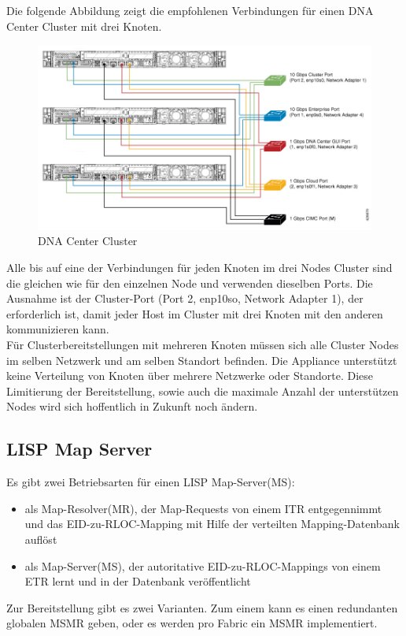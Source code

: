Die folgende Abbildung zeigt die empfohlenen Verbindungen für einen DNA Center Cluster mit drei Knoten. 
\begin{figure}[H]
	\centering
	\includegraphics[width=0.8\linewidth]{img/Absicherung/DNAC-Cluster}
	\caption{DNA Center Cluster \cite{DNAC-Cluster} }
	\label{fig:DNA Center Cluster}
\end{figure}
Alle bis auf eine der Verbindungen für jeden Knoten im drei Nodes Cluster sind die gleichen wie für den einzelnen Node und verwenden dieselben Ports. Die Ausnahme ist der Cluster-Port (Port 2, enp10so, Network Adapter 1), der erforderlich ist, damit jeder Host im Cluster mit drei Knoten mit den anderen kommunizieren kann. \\

Für Clusterbereitstellungen mit mehreren Knoten müssen sich alle Cluster Nodes im selben Netzwerk und am selben Standort befinden. Die Appliance unterstützt keine Verteilung von Knoten über mehrere Netzwerke oder Standorte. Diese Limitierung der Bereitstellung, sowie auch die maximale Anzahl der unterstützen Nodes wird sich hoffentlich in Zukunft noch ändern.

\subsection{LISP Map Server}
Es gibt zwei Betriebsarten für einen LISP Map-Server(MS): 
\begin{itemize}
	\item als Map-Resolver(MR), der Map-Requests von einem ITR entgegennimmt und das EID-zu-RLOC-Mapping mit Hilfe der verteilten Mapping-Datenbank auflöst
	\item als Map-Server(MS), der autoritative EID-zu-RLOC-Mappings von einem ETR lernt und in der Datenbank veröffentlicht
\end{itemize}

Zur Bereitstellung gibt es zwei Varianten. Zum einem kann es einen redundanten globalen MSMR geben, oder es werden pro Fabric ein MSMR implementiert.

